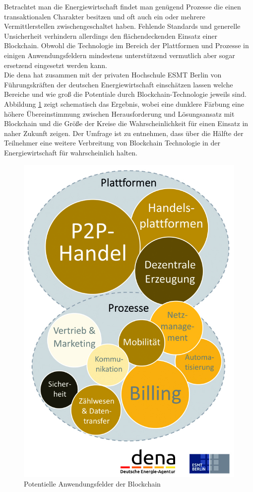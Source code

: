 Betrachtet man die Energiewirtschaft findet man genügend Prozesse die einen transaktionalen Charakter besitzen und oft auch ein oder mehrere Vermittlerstellen zwischengeschaltet haben. Fehlende Standards und generelle Unsicherheit verhindern allerdings den flächendeckenden Einsatz einer Blockchain. Obwohl die Technologie im Bereich der Plattformen und Prozesse in einigen Anwendungsfeldern mindestens unterstützend vermutlich aber sogar ersetzend eingesetzt werden kann.\\

Die \ac{dena} hat zusammen mit der privaten Hochschule ESMT Berlin von Führungskräften der deutschen Energiewirtschaft einschätzen lassen welche Bereiche und wie groß die Potentiale durch Blockchain-Technologie jeweils sind. Abbildung \ref{fig:dena-blockchain-use-cases} zeigt schematisch das Ergebnis, wobei eine dunklere Färbung eine höhere Übereinstimmung zwischen Herausforderung und Lösungsansatz mit Blockchain und die Größe der Kreise die Wahrscheinlichkeit für einen Einsatz in naher Zukunft zeigen. Der Umfrage ist zu entnehmen, dass über die Hälfte der Teilnehmer eine weitere Verbreitung von Blockchain Technologie in der Energiewirtschaft für wahrscheinlich halten.\cite[vgl.]{EnergieAgentur2016}

\begin{figure}[h!]
	\centering
	\includegraphics[width=0.41\linewidth]{pictures/dena-blockchain-use-cases}
	\caption[dena Potentielle Anwendungsfelder der Blockchain]{Potentielle Anwendungsfelder der Blockchain\cite{EnergieAgentur2016}}
	\label{fig:dena-blockchain-use-cases}
\end{figure}




\newpage